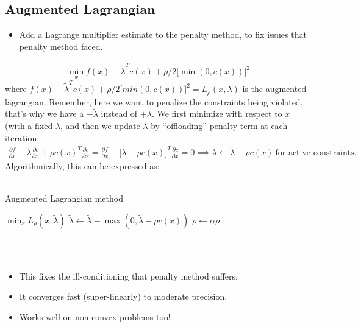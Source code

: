 \subsection{Augmented Lagrangian}
\begin{itemize}
    \item Add a Lagrange multiplier estimate to the penalty method,  to fix issues that penalty method faced.
\end{itemize}
\begin{align}
    \min_x f(x) - \tilde{\lambda}^T c(x) + \rho /2 \big[ \min(0,c(x)) \big]^2
\end{align}
where $f(x) - \tilde{\lambda}^T c(x) + \rho /2 \big[ min(0,c(x)) \big]^2 = L_{\rho}(x,\lambda)$ is the augmented lagrangian. 
Remember, here we want to penalize the constraints being violated, that's why we have a $-\tilde{\lambda}$ instead of $+\lambda$.
We first minimize with respect to $x$ (with a fixed $\tilde{\lambda}$, and then we update $\tilde{\lambda}$ by ``offloading'' penalty term at each iteration: 
\begin{align}
    \frac{\partial f}{\partial x} - \tilde{\lambda} \frac{\partial c}{\partial x} + \rho c(x)^T \frac{\partial c}{\partial x} = \frac{\partial f}{\partial x} - \big[ \tilde{\lambda} - \rho c(x) \big]^T \frac{\partial c}{\partial x} = 0
    \implies \tilde{\lambda} \gets \tilde{\lambda} - \rho c(x) \ \textrm{for active constraints}.
\end{align}
Algorithmically, this can be expressed as: 
\\
\\
\noindent
\begin{algorithm}
	\caption{Augmented Lagrangian method}
	\label{alg:auglag}
	\begin{algorithmic}[1]	
            \State $\min_x L_{\rho} (x, \tilde{\lambda})$ 
            \State $\tilde{\lambda} \gets \tilde{\lambda} - \max(0, \tilde{\lambda}-\rho c(x)) $ 
            \State $\rho \gets \alpha \rho$ 
        \EndWhile
	\end{algorithmic}
\end{algorithm}
\\
\\
\begin{itemize}
    \item This fixes the ill-conditioning that penalty method suffers. 
    \item It converges fast (super-linearly) to moderate precision. 
    \item Works well on non-convex problems too! 
\end{itemize}

